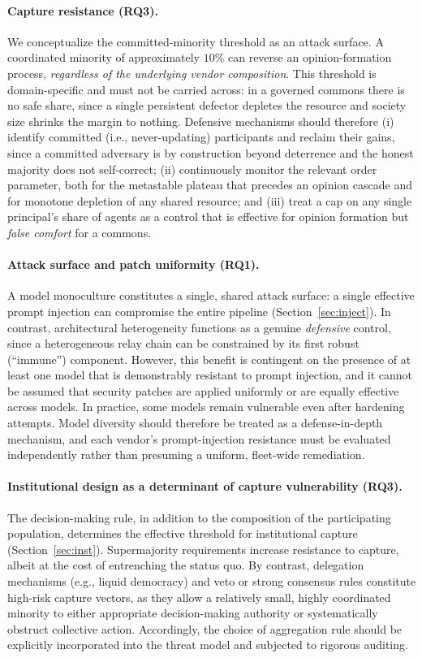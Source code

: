 \documentclass[manuscript,screen,review]{acmart}
\newcommand{\rev}[1]{\textcolor{revblue}{#1}}
\begin{document}
\paragraph{Capture resistance (RQ3).} We conceptualize the committed-minority threshold as an attack surface. \rev{A coordinated minority of approximately $10\%$ can reverse an opinion-formation process, \emph{regardless of the underlying vendor composition}. This threshold is domain-specific and must not be carried across: in a governed commons there is no safe share, since a single persistent defector depletes the resource and society size shrinks the margin to nothing. Defensive mechanisms should therefore (i) identify committed (i.e., never-updating) participants and reclaim their gains, since a committed adversary is by construction beyond deterrence and the honest majority does not self-correct; (ii) continuously monitor the relevant order parameter, both for the metastable plateau that precedes an opinion cascade and for monotone depletion of any shared resource; and (iii) treat a cap on any single principal’s share of agents as a control that is effective for opinion formation but \emph{false comfort} for a commons.}

\paragraph{Attack surface and patch uniformity (RQ1).} A model monoculture constitutes a single, shared attack surface: a single effective prompt injection can compromise the entire pipeline (Section~\ref{sec:inject}). In contrast, architectural heterogeneity functions as a genuine \emph{defensive} control, since a heterogeneous relay chain can be constrained by its first robust (“immune”) component. However, this benefit is contingent on the presence of at least one model that is demonstrably resistant to prompt injection, and it cannot be assumed that security patches are applied uniformly or are equally effective across models. In practice, some models remain vulnerable even after hardening attempts. Model diversity should therefore be treated as a defense-in-depth mechanism, and each vendor’s prompt-injection resistance must be evaluated independently rather than presuming a uniform, fleet-wide remediation.

\paragraph{Institutional design as a determinant of capture vulnerability (RQ3).} The decision-making rule, in addition to the composition of the participating population, determines the effective threshold for institutional capture (Section~\ref{sec:inst}). Supermajority requirements increase resistance to capture, albeit at the cost of entrenching the status quo. By contrast, delegation mechanisms (e.g., liquid democracy) and veto or strong consensus rules constitute high-risk capture vectors, as they allow a relatively small, highly coordinated minority to either appropriate decision-making authority or systematically obstruct collective action. Accordingly, the choice of aggregation rule should be explicitly incorporated into the threat model and subjected to rigorous auditing.
\end{document}

